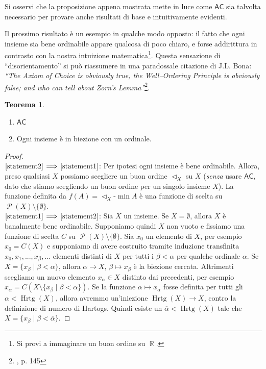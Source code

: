 \documentclass[12pt,a4paper]{report}
\theoremstyle{definition}
\newtheorem{teo}{Teorema}[section]  %
\theoremstyle{num.custom-title}
\DeclareMathOperator{\PP}{\mathcal{P}}
\DeclareMathOperator{\Hrtg}{\text{Hrtg}}
\DeclareMathOperator{\R}{\mathbb{R}}
\DeclareMathOperator{\sm}{\setminus}
\newcommand{\AC}{\ensuremath{\mathsf{AC}}\xspace}
\newcommand{\Implies}[2]{$\text{\ref{statement#1}}\!\implies\!\text{\ref{statement#2}}$}%
\newcommand{\punto}[1]{\item \label{statement#1}}
\newenvironment{equivalence}
    {\begin{enumerate}[label=(\arabic*),ref=(\arabic*)]
    }
    { 
	\end{enumerate}
    }
\begin{document}
Si osservi che la proposizione appena mostrata mette in luce come \AC sia talvolta necessario per provare anche risultati di base e intuitivamente evidenti.

Il prossimo risultato è un esempio in qualche modo opposto: il fatto che ogni insieme sia bene ordinabile appare qualcosa di poco chiaro, e forse addirittura in contrasto con la nostra intuizione matematica\footnote{Si provi a immaginare un buon ordine su $\R$.}. Questa sensazione di ``disorientamento'' si può riassumere in una paradossale citazione di J.L. Bona: \emph{``The Axiom of Choice is obviously true, the Well–Ordering Principle is obviously false; and who can tell about Zorn’s Lemma''}\footnote{\cite{Sch97:Herrlich}, p. 145}.

\begin{teo}\label{AC-WOT}
\begin{equivalence}
\punto{1} \AC
\punto{2} Ogni insieme è in biezione con un ordinale.
\end{equivalence}
\begin{proof}\ \\
\Implies{2}{1}: Per ipotesi ogni insieme è bene ordinabile. Allora, preso qualsiasi $X$ possiamo scegliere un buon ordine $\vartriangleleft_X$ su $X$ (\emph{senza} usare \AC, dato che stiamo scegliendo un buon ordine per un singolo insieme $X$). La funzione definita da $f(A)=\vartriangleleft_X$-$\min A$ è una funzione di scelta su $\PP (X) \sm \{\emptyset\}$.\\
\Implies{1}{2}: Sia $X$ un insieme. Se $X = \emptyset$, allora $X$ è banalmente bene ordinabile. Supponiamo quindi $X$ non vuoto e fissiamo una funzione di scelta $C$ su $\PP (X) \sm \{\emptyset\}$. Sia $x_0$ un elemento di $X$, per esempio $x_0=C(X)$ e supponiamo di avere costruito tramite induzione transfinita $x_0, x_1, ..., x_\beta, ...$ elementi distinti di $X$ per tutti i $\beta < \alpha$ per qualche ordinale $\alpha$. Se $X=\{x_\beta \mid \beta < \alpha\}$, allora $\alpha \to X$, $\beta \mapsto x_\beta$ è la biezione cercata. Altrimenti scegliamo un nuovo elemento $x_\alpha \in X$ distinto dai precedenti, per esempio $x_\alpha = C(X \sm \{x_\beta \mid \beta < \alpha\})$. Se la funzione $\alpha \mapsto x_\alpha$ fosse definita per tutti gli $\alpha < \Hrtg(X)$, allora avremmo un'iniezione $\Hrtg(X) \to X$, contro la definizione di numero di Hartogs. Quindi esiste un $\overline{\alpha} < \Hrtg(X)$ tale che $X=\{x_\beta \mid \beta < \overline{\alpha}\}$.
\end{proof}
\end{teo}
\end{document}
